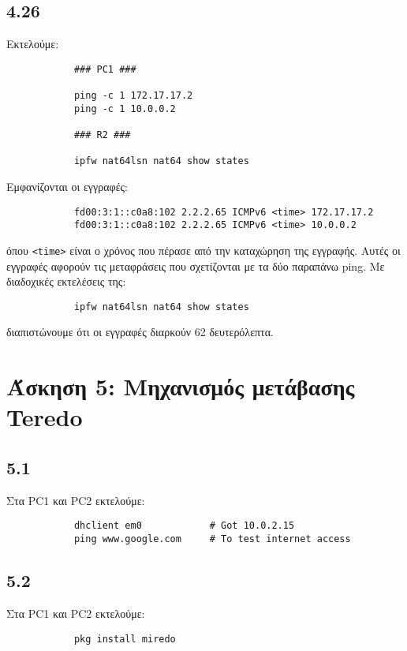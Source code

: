 \documentclass[a4paper, 12pt]{article}
\begin{document}
	\subsection*{4.26}
		Εκτελούμε:
		
		\begin{verbatim}
			### PC1 ###
			
			ping -c 1 172.17.17.2
			ping -c 1 10.0.0.2
			
			### R2 ###
			
			ipfw nat64lsn nat64 show states
		\end{verbatim}
		
		Εμφανίζονται οι εγγραφές:
		
		\begin{verbatim}
			fd00:3:1::c0a8:102 2.2.2.65 ICMPv6 <time> 172.17.17.2
			fd00:3:1::c0a8:102 2.2.2.65 ICMPv6 <time> 10.0.0.2
		\end{verbatim}
		
		όπου \verb|<time>| είναι ο χρόνος που πέρασε από την καταχώρηση της εγγραφής. Αυτές οι εγγραφές αφορούν τις μεταφράσεις που σχετίζονται με τα δύο παραπάνω ping. Με διαδοχικές εκτελέσεις της:
		
		\begin{verbatim}
			ipfw nat64lsn nat64 show states
		\end{verbatim}
	 	
	 	διαπιστώνουμε ότι οι εγγραφές διαρκούν 62 δευτερόλεπτα.

\section*{Άσκηση 5: Μηχανισμός μετάβασης Teredo}

	\subsection*{5.1}
		Στα PC1 και PC2 εκτελούμε:
		
		\begin{verbatim}			
			dhclient em0            # Got 10.0.2.15
			ping www.google.com     # To test internet access
		\end{verbatim}

	\subsection*{5.2}
		Στα PC1 και PC2 εκτελούμε:
		
		\begin{verbatim}
			pkg install miredo
		\end{verbatim}
\end{document}
